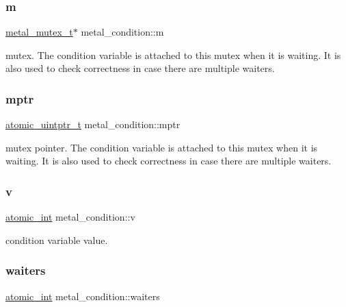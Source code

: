 \mbox{\label{structmetal__condition_a424d948a9bebdc54fd34b3b89d667140}} 
\subsubsection{\texorpdfstring{m}{m}}
{\footnotesize\ttfamily \hyperlink{structmetal__mutex__t}{metal\+\_\+mutex\+\_\+t}$\ast$ metal\+\_\+condition\+::m}

mutex. The condition variable is attached to this mutex when it is waiting. It is also used to check correctness in case there are multiple waiters. \mbox{\label{structmetal__condition_af8373265030f4b57ea2670797ff0adad}} 
\subsubsection{\texorpdfstring{mptr}{mptr}}
{\footnotesize\ttfamily \hyperlink{compiler_2gcc_2atomic_8h_aaa955a590bd7e8ef3f098f914978c8f6}{atomic\+\_\+uintptr\+\_\+t} metal\+\_\+condition\+::mptr}

mutex pointer. The condition variable is attached to this mutex when it is waiting. It is also used to check correctness in case there are multiple waiters. \mbox{\label{structmetal__condition_a18f14ef5fa6b870c55112dc661f08887}} 
\subsubsection{\texorpdfstring{v}{v}}
{\footnotesize\ttfamily \hyperlink{compiler_2gcc_2atomic_8h_a3584358b6d722cb0cca04ac3cfd8a674}{atomic\+\_\+int} metal\+\_\+condition\+::v}

condition variable value. \mbox{\label{structmetal__condition_a518ab57574502db086f2c5e344d20770}} 
\subsubsection{\texorpdfstring{waiters}{waiters}}
{\footnotesize\ttfamily \hyperlink{compiler_2gcc_2atomic_8h_a3584358b6d722cb0cca04ac3cfd8a674}{atomic\+\_\+int} metal\+\_\+condition\+::waiters}

